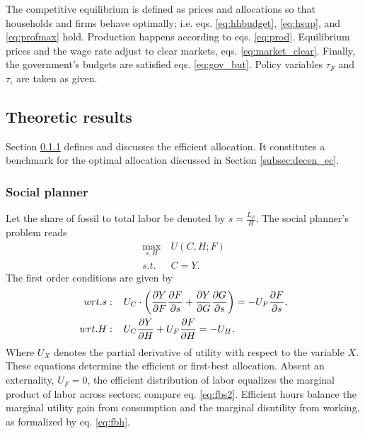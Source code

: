 The competitive equilibrium is defined as prices and allocations so that households and firms behave optimally; i.e. eqs. \eqref{eq:hhbudget}, \eqref{eq:hsup}, and \eqref{eq:profmax} hold. Production happens according to eqs. \eqref{eq:prod}.  Equilibrium prices and the wage rate adjust to clear markets, eqs. \eqref{eq:market_clear}. Finally, the government's budgets are satisfied eqs. \eqref{eq:gov_but}. Policy variables $\tau_F$ and $\tau_\iota$ are taken as given. 

\subsection{Theoretic results}\label{sec:theory}
Section \ref{subsec:sp2} defines and discusses the efficient allocation. It constitutes a benchmark for the optimal allocation discussed in Section \ref{subsec:decen_ec}. 

\subsubsection{Social planner}\label{subsec:sp2}
Let the share of fossil to total labor be denoted by $s=\frac{L_F}{H}$. The social planner's problem reads
\begin{align*}
\underset{s, H}{\max}\ & U(C,H; F)\\ s.t.\ \ & C=Y.
\end{align*}
The first order conditions are given by
\begin{align}
wrt. s:\hspace{4mm} & U_C \cdot \left(\frac{\partial{Y}}{\partial{F}}\frac{\partial{F}}{\partial{s}}+\frac{\partial{Y}}{\partial{G}}\frac{\partial{G}}{\partial{s}}\right)=-U_F\frac{\partial{F}}{\partial{s}}, \label{eq:fbs2}\\
wrt. H:\hspace{4mm}& U_C\frac{\partial{Y}}{\partial{H}}+U_F\frac{\partial{F}}{\partial{H}}=-U_H. \label{eq:fbh}
\end{align}
Where $U_X$ denotes the partial derivative of utility with respect to the variable $X$.
These equations determine the efficient or first-best allocation. 
Absent an externality, $U_F=0$, the efficient distribution of labor equalizes the marginal product of labor across sectors; compare eq. \eqref{eq:fbs2}. Efficient hours balance the marginal utility gain from consumption and the marginal disutility from working, as formalized by eq. \eqref{eq:fbh}. 

